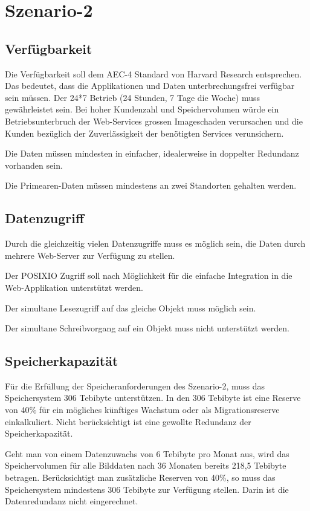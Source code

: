\section{Szenario-2}

\subsection{Verfügbarkeit}
Die Verfügbarkeit soll dem AEC-4 Standard von Harvard Research entsprechen. Das bedeutet, dass die Applikationen und Daten unterbrechungsfrei verfügbar sein müssen.  Der 24*7 Betrieb (24 Stunden, 7 Tage die Woche) muss gewährleistet sein. Bei hoher Kundenzahl und Speichervolumen würde ein Betriebsunterbruch der Web-Services grossen Imageschaden verursachen und die Kunden bezüglich der Zuverlässigkeit der benötigten Services verunsichern.

Die Daten müssen mindesten in einfacher, idealerweise in doppelter Redundanz vorhanden sein. 

Die \gls{Primearen-Daten} müssen mindestens an zwei Standorten gehalten werden.

\subsection{Datenzugriff}
Durch die gleichzeitig vielen Datenzugriffe muss es möglich sein, die Daten durch mehrere Web-Server zur Verfügung zu stellen.

Der \gls{POSIXIO} Zugriff soll nach Möglichkeit für die einfache Integration in die Web-Applikation unterstützt werden.

Der simultane Lesezugriff auf das gleiche Objekt muss möglich sein.

Der simultane Schreibvorgang auf ein Objekt muss nicht unterstützt werden.

\subsection{Speicherkapazität}
Für die Erfüllung der Speicheranforderungen des Szenario-2, muss das Speichersystem 306 Tebibyte unterstützen. In den 306 Tebibyte ist eine Reserve von 40\% für ein mögliches künftiges Wachstum oder als Migrationsreserve einkalkuliert. Nicht berücksichtigt ist eine gewollte Redundanz der Speicherkapazität.

Geht man von einem Datenzuwachs von 6 Tebibyte pro Monat aus, wird das Speichervolumen für alle Bilddaten nach 36 Monaten bereits 218,5 Tebibyte betragen. Berücksichtigt man zusätzliche Reserven von 40\%, so muss das Speichersystem mindestens 306 Tebibyte zur Verfügung stellen. Darin ist die Datenredundanz nicht eingerechnet.

